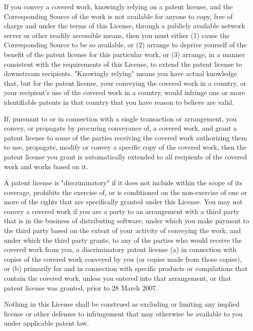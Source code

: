 \documentclass[parskip=half]{scrartcl}
\begin{document}
  If you convey a covered work, knowingly relying on a patent license,
and the Corresponding Source of the work is not available for anyone
to copy, free of charge and under the terms of this License, through a
publicly available network server or other readily accessible means,
then you must either (1) cause the Corresponding Source to be so
available, or (2) arrange to deprive yourself of the benefit of the
patent license for this particular work, or (3) arrange, in a manner
consistent with the requirements of this License, to extend the patent
license to downstream recipients.  "Knowingly relying" means you have
actual knowledge that, but for the patent license, your conveying the
covered work in a country, or your recipient's use of the covered work
in a country, would infringe one or more identifiable patents in that
country that you have reason to believe are valid.

  If, pursuant to or in connection with a single transaction or
arrangement, you convey, or propagate by procuring conveyance of, a
covered work, and grant a patent license to some of the parties
receiving the covered work authorizing them to use, propagate, modify
or convey a specific copy of the covered work, then the patent license
you grant is automatically extended to all recipients of the covered
work and works based on it.

  A patent license is "discriminatory" if it does not include within
the scope of its coverage, prohibits the exercise of, or is
conditioned on the non-exercise of one or more of the rights that are
specifically granted under this License.  You may not convey a covered
work if you are a party to an arrangement with a third party that is
in the business of distributing software, under which you make payment
to the third party based on the extent of your activity of conveying
the work, and under which the third party grants, to any of the
parties who would receive the covered work from you, a discriminatory
patent license (a) in connection with copies of the covered work
conveyed by you (or copies made from those copies), or (b) primarily
for and in connection with specific products or compilations that
contain the covered work, unless you entered into that arrangement,
or that patent license was granted, prior to 28 March 2007.

  Nothing in this License shall be construed as excluding or limiting
any implied license or other defenses to infringement that may
otherwise be available to you under applicable patent law.
\end{document}
